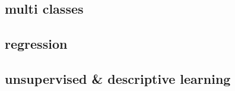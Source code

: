 \documentclass[cheatsheet.tex]{subfiles}
\begin{document}
\subsection{multi classes}
\lipsum[1-2]
\subsection{regression}
\lipsum[1-2]
\subsection{unsupervised \& descriptive learning}
\lipsum[1-2]
\end{document}
